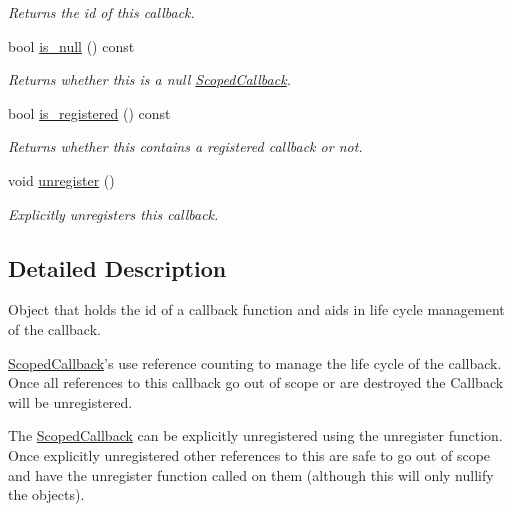 \begin{DoxyCompactItemize}
\begin{DoxyCompactList}\small\item\em Returns the id of this callback. \end{DoxyCompactList}\item 
bool \hyperlink{classsigma_1_1core_1_1_scoped_callback_a2e2737f20e405f06f5d5a640c5746d70}{is\-\_\-null} () const 
\begin{DoxyCompactList}\small\item\em Returns whether this is a null \hyperlink{classsigma_1_1core_1_1_scoped_callback}{Scoped\-Callback}. \end{DoxyCompactList}\item 
bool \hyperlink{classsigma_1_1core_1_1_scoped_callback_adafe2e52e653bca84d11f1d0baaec616}{is\-\_\-registered} () const 
\begin{DoxyCompactList}\small\item\em Returns whether this contains a registered callback or not. \end{DoxyCompactList}\item 
void \hyperlink{classsigma_1_1core_1_1_scoped_callback_ad8d8ea4671f58077c8f9ef020e52e125}{unregister} ()
\begin{DoxyCompactList}\small\item\em Explicitly unregisters this callback. \end{DoxyCompactList}\end{DoxyCompactItemize}


\subsection{Detailed Description}
Object that holds the id of a callback function and aids in life cycle management of the callback. 

\hyperlink{classsigma_1_1core_1_1_scoped_callback}{Scoped\-Callback}'s use reference counting to manage the life cycle of the callback. Once all references to this callback go out of scope or are destroyed the Callback will be unregistered.

The \hyperlink{classsigma_1_1core_1_1_scoped_callback}{Scoped\-Callback} can be explicitly unregistered using the {\ttfamily unregister} function. Once explicitly unregistered other references to this are safe to go out of scope and have the {\ttfamily unregister} function called on them (although this will only nullify the objects). 

